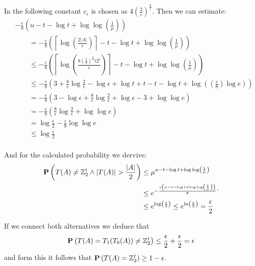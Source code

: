In the following constant $c_{\epsilon}$ is chosen as $4\left(\frac{2}{\epsilon}\right) ^ {\frac{8}{\epsilon}}$. Then we can estimate:
\[
\begin{split}
& -\frac{\epsilon}{8} \left(u - t - \log t + \log \log \left( \frac{1}{\mu} \right) \right) \\
& \qquad = -\frac{\epsilon}{8}\left(\left\lceil\log\left(\frac{2|A|}{\epsilon}\right)\right\rceil - t - \log t + \log\log\left(\frac{1}{\mu}\right)\right) \\
& \qquad \leq -\frac{\epsilon}{8} \left( \left\lceil \log\left( \frac{8 \left(\frac{2}{\epsilon}\right) ^ {\frac{8}{\epsilon}}t2^t}{\epsilon} \right) \right\rceil - t - \log t + \log\log\left(\frac{1}{\mu}\right)\right) \\
& \qquad \leq -\frac{\epsilon}{8} \left(3 + \frac{8}{\epsilon}\log\frac{2}{\epsilon} - \log\epsilon + \log t + t - t - \log t + \log \left( \left(\frac{\epsilon}{8}\right)\log e \right) \right) \\
& \qquad = -\frac{\epsilon}{8} \left(3 - \log\epsilon + \frac{8}{\epsilon} \log \frac{2}{\epsilon} + \log\epsilon - 3 + \log\log e\right) \\
& \qquad = -\frac{\epsilon}{8}\left(\frac{8}{\epsilon}\log \frac{2}{\epsilon} + \log\log e\right) \\
& \qquad = \log \frac{\epsilon}{2} - \frac{\epsilon}{8} \log\log e \\
& \qquad \leq \log\frac{\epsilon}{2} \\
\end{split}
\]

And for the calculated probability we dervive:
\[
\begin{split}
\mathbf{P}\left(T(A) \neq \mathbb{Z}_{2}^{t} \wedge |T(A)| > \frac{|A|}{2}\right) 
	& \leq \mu ^ {u - t - \log t + \log\log\left(\frac{1}{\mu}\right)} \\
	& \leq e ^ {-\frac{\epsilon\left(u - t - \log t + \log\log\left(\frac{1}{\mu}\right)\right)}{8}} \\
	& \leq e ^ {\log \left( \frac{\epsilon}{2} \right)} \leq e ^ {\ln \left(\frac{\epsilon}{2}\right)} = \frac{\epsilon}{2} \\
\end{split} \text{.}
\]

If we connect both alternatives we deduce that 
\[ 
	\mathbf{P}\left(T(A) = T_1(T_0(A)) \neq \mathbb{Z}_{2}^{t}\right) \leq \frac{\epsilon}{2} + \frac{
\epsilon}{2} = \epsilon
\]
and form this it follows that $\mathbf{P}\left(T(A) = \mathbb{Z}_{2}^{t}\right) \geq 1 - \epsilon$.
